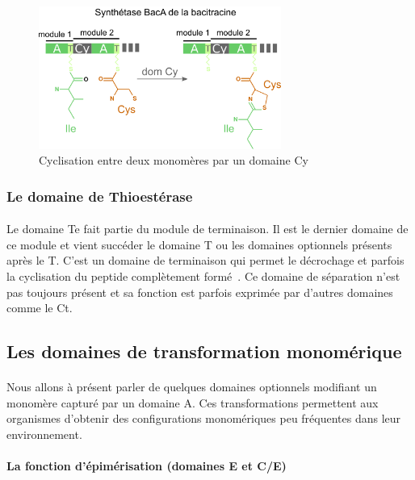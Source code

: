 \documentclass[12pt,french,twoside]{report}
\begin{document}
\begin{figure}[h!]
  \begin{center}
    \includegraphics[width=300px]{Figures/bio/Intro/domainCy_bacitracine.png}
    \caption{\label{domaine_Cy}Cyclisation entre deux monomères par un domaine Cy}
  \end{center}
\end{figure}


\subsubsection{Le domaine de Thioestérase}

\paragraph{}Le domaine Te fait partie du module de terminaison.
Il est le dernier domaine de ce module et vient succéder le domaine T ou les domaines optionnels présents après le T.
C'est un domaine de terminaison qui permet le décrochage et parfois la cyclisation du peptide complètement formé~\cite{trauger_peptide_2000,kohli_thioesterase_2002}.
Ce domaine de séparation n'est pas toujours présent et sa fonction est parfois exprimée par d'autres domaines comme le Ct.


\subsection{Les domaines de transformation monomérique}

\paragraph{}Nous allons à présent parler de quelques domaines optionnels modifiant un monomère capturé par un domaine A.
Ces transformations permettent aux organismes d'obtenir des configurations monomériques peu fréquentes dans leur environnement.


\paragraph{La fonction d'épimérisation (domaines E et C/E)}
\end{document}
